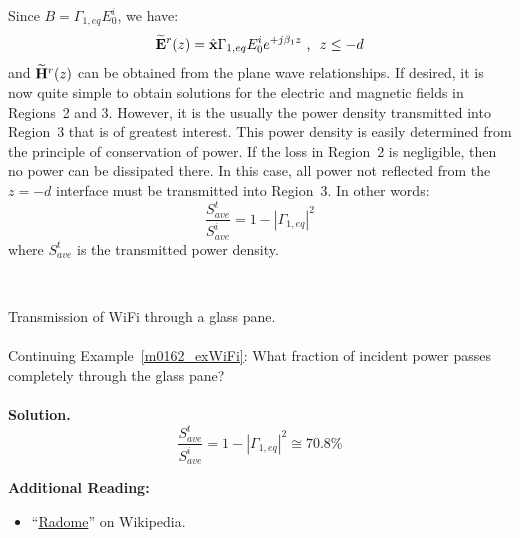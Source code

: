 Since $B=\Gamma_{1,eq}E_0^i$, we have:
%
\begin{equation}
\widetilde{\bf E}^r(z) = \hat{\bf x} \Gamma_{1,eq} E_0^i e^{+j\beta_1 z}~\mbox{,}~~z \le -d
\end{equation}
%
and $\widetilde{\bf H}^r(z)$ can be obtained from the plane wave relationships. 
If desired, it is now quite simple to obtain solutions for the electric and magnetic fields in Regions~2 and 3.
However, it is the usually the power density transmitted into Region~3 that is of greatest interest.
This power density is easily determined from the principle of conservation of power.
If the loss in Region~2 is negligible, then no power can be dissipated there.
In this case, all power not reflected from the $z=-d$ interface must be transmitted into Region~3.
In other words:
%
\begin{equation}
\boxed{ \frac{S_{ave}^t}{S_{ave}^i} = 1-|\Gamma_{1,eq}|^2 } 
\label{m0162_eSavet}
\end{equation} 
%
where $S_{ave}^t$ is the transmitted power density. 

~\\ \begin{example} 
\begin{mdframed}[backgroundcolor=brown!20,linecolor=brown!20]\raggedright
Transmission of WiFi through a glass pane.
\\~\\
Continuing Example~\ref{m0162_exWiFi}: What fraction of incident power passes completely through the glass pane?\\
~\\

\noindent
{\bf Solution.} 
%
\begin{equation}
\frac{S_{ave}^t}{S_{ave}^i} = 1-|\Gamma_{1,eq}|^2 \cong \boxed{\mbox{70.8\%}}
\end{equation}
%
\end{mdframed}
\end{example}

{\bf Additional Reading:}
\begin{itemize}
\item ``\href{https://en.wikipedia.org/wiki/Radome}{Radome}'' on Wikipedia.
\end{itemize}

